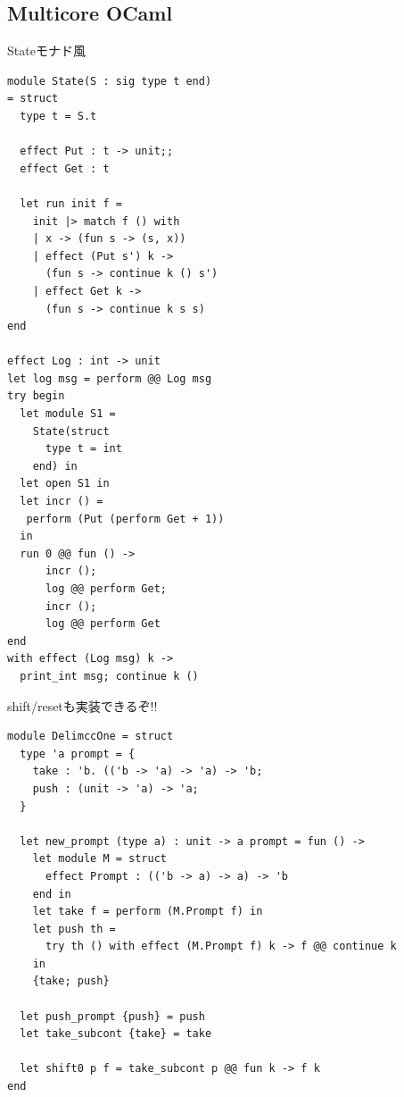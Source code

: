 \documentclass[unicode,compress,14pt,CJK%
\directlua{
    handout = os.getenv"HANDOUT"
    local _ = handout and tex.print(",handout")
},t]{beamer}
\begin{document}
\subsection{Multicore OCaml}
\begin{frame}[fragile]
    \frametitlesubs

    {\small Stateモナド風}

    \begin{multicols}{2}
        \begin{lstlisting}[basicstyle=\scriptsize\ttfamily\color{green!60!black}]
module State(S : sig type t end)
= struct
  type t = S.t

  effect Put : t -> unit;;
  effect Get : t

  let run init f =
    init |> match f () with
    | x -> (fun s -> (s, x))
    | effect (Put s') k ->
      (fun s -> continue k () s')
    | effect Get k ->
      (fun s -> continue k s s)
end

effect Log : int -> unit
let log msg = perform @@ Log msg
try begin
  let module S1 =
    State(struct
      type t = int
    end) in
  let open S1 in
  let incr () = 
   perform (Put (perform Get + 1))
  in
  run 0 @@ fun () ->
      incr ();
      log @@ perform Get;
      incr ();
      log @@ perform Get
end
with effect (Log msg) k ->
  print_int msg; continue k ()
        \end{lstlisting}
    \end{multicols}

    \vfill
\end{frame}

\hypertarget{fr:delimcc}{}
\label{fr:deimcc}
\begin{frame}[fragile]
    \frametitlesubs

    shift/resetも実装できるぞ!!
    \begin{lstlisting}[basicstyle=\scriptsize\ttfamily\color{green!60!black}]
module DelimccOne = struct
  type 'a prompt = {
    take : 'b. (('b -> 'a) -> 'a) -> 'b;
    push : (unit -> 'a) -> 'a;
  }

  let new_prompt (type a) : unit -> a prompt = fun () ->
    let module M = struct
      effect Prompt : (('b -> a) -> a) -> 'b
    end in
    let take f = perform (M.Prompt f) in
    let push th =
      try th () with effect (M.Prompt f) k -> f @@ continue k
    in
    {take; push}

  let push_prompt {push} = push
  let take_subcont {take} = take

  let shift0 p f = take_subcont p @@ fun k -> f k
end
    \end{lstlisting}
\end{frame}
\end{document}

